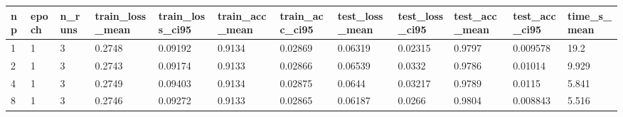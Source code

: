 \begin{tabular}{llllllllllll}
\hline
np & epoch & n\_runs & train\_loss\_mean & train\_loss\_ci95 & train\_acc\_mean & train\_acc\_ci95 & test\_loss\_mean & test\_loss\_ci95 & test\_acc\_mean & test\_acc\_ci95 & time\_s\_mean \\
\hline
1 & 1 & 3 & 0.2748 & 0.09192 & 0.9134 & 0.02869 & 0.06319 & 0.02315 & 0.9797 & 0.009578 & 19.2 \\
2 & 1 & 3 & 0.2743 & 0.09174 & 0.9133 & 0.02866 & 0.06539 & 0.0332 & 0.9786 & 0.01014 & 9.929 \\
4 & 1 & 3 & 0.2749 & 0.09403 & 0.9134 & 0.02875 & 0.0644 & 0.03217 & 0.9789 & 0.0115 & 5.841 \\
8 & 1 & 3 & 0.2746 & 0.09272 & 0.9133 & 0.02865 & 0.06187 & 0.0266 & 0.9804 & 0.008843 & 5.516 \\
\hline
\end{tabular}
